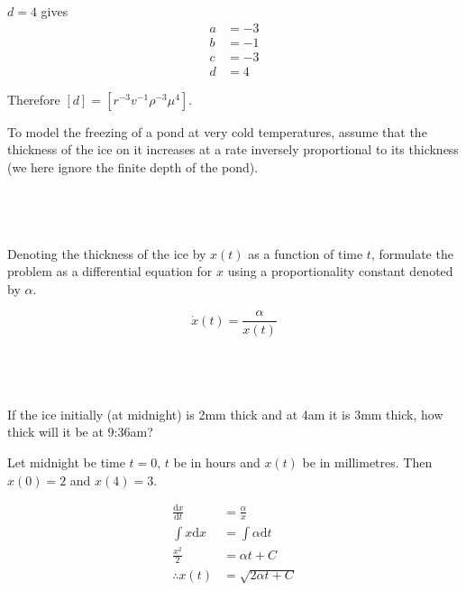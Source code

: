 \documentclass[a4paper]{article}
\begin{document}
$d=4$ gives \begin{align*}
    a &= -3 \\
    b &= -1 \\
    c &= -3 \\
    d &= 4
\end{align*}

Therefore $[d] = \left[ r^{-3} v^{-1} \rho^{-3} \mu^4 \right]$.


\begin{questionbody}
To model the freezing of a pond at very cold temperatures, assume that the thickness of the ice on it increases at a rate inversely proportional to its thickness (we here ignore the finite depth of the pond).
\end{questionbody}

\subsection{~} %

\begin{questionbody}
Denoting the thickness of the ice by $x(t)$ as a function of time $t$, formulate the problem as a differential equation for $x$ using a proportionality constant denoted by $\alpha$.
\end{questionbody}

\[ \dot x(t) = \frac{\alpha}{x(t)} \]

\subsection{~} %

\begin{questionbody}
If the ice initially (at midnight) is 2mm thick and at 4am it is 3mm thick, how thick will it be at 9:36am?
\end{questionbody}

Let midnight be time $t = 0$, $t$ be in hours and $x(t)$ be in millimetres. Then $x(0) = 2$ and $x(4) = 3$.

\begin{align*}
    \frac{\mathrm d x}{\mathrm d t} &= \frac{\alpha}{x} \\
    \int x \mathrm d x              &= \int \alpha \mathrm d t \\
    \frac{x^2}{2}                   &= \alpha t + C \\
    \therefore x(t)                 &= \sqrt{2\alpha t + C}
\end{align*}
\end{document}
